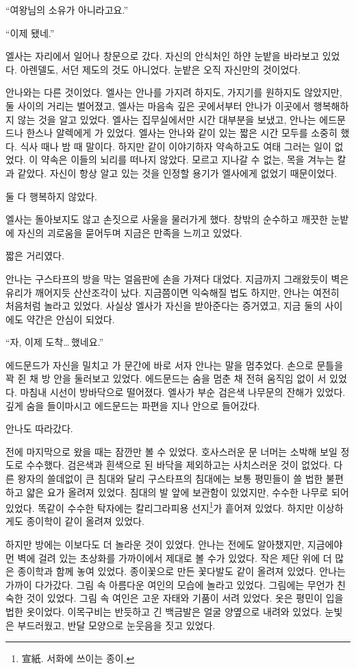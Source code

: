 ``여왕님의 소유가 아니라고요.''

``이제 됐네.''

엘사는 자리에서 일어나 창문으로 갔다. 자신의 안식처인 하얀 눈밭을 바라보고 있었다. 아렌델도, 서던 제도의 것도 아니었다. 눈밭은 오직 자신만의 것이었다.

안나와는 다른 것이었다. 엘사는 안나를 가지려 하지도, 가지기를 원하지도 않았지만, 둘 사이의 거리는 벌어졌고, 엘사는 마음속 깊은 곳에서부터 안나가 이곳에서 행복해하지 않는 것을 알고 있었다. 엘사는 집무실에서만 시간 대부분을 보냈고, 안나는 에드문드나 한스나 알렉에게 가 있었다. 엘사는 안나와 같이 있는 짧은 시간 모두를 소중히 했다. 식사 때나 밤 때 말이다. 하지만 같이 이야기하자 약속하고도 여태 그러는 일이 없었다. 이 약속은 이들의 뇌리를 떠나지 않았다. 모르고 지나갈 수 없는, 목을 겨누는 칼과 같았다. 자신이 항상 알고 있는 것을 인정할 용기가 엘사에게 없었기 때문이었다.

둘 다 행복하지 않았다.

엘사는 돌아보지도 않고 손짓으로 사울을 물러가게 했다. 창밖의 순수하고 깨끗한 눈밭에 자신의 괴로움을 묻어두며 지금은 만족을 느끼고 있었다.

\textbreak

짧은 거리였다.

안나는 구스타프의 방을 막는 얼음판에 손을 가져다 대었다. 지금까지 그래왔듯이 벽은 유리가 깨어지듯 산산조각이 났다. 지금쯤이면 익숙해질 법도 하지만, 안나는 여전히 처음처럼 놀라고 있었다. 사실상 엘사가 자신을 받아준다는 증거였고, 지금 둘의 사이에도 약간은 안심이 되었다.

``자, 이제 도착\ldots\,했네요.''

에드문드가 자신을 밀치고 가 문간에 바로 서자 안나는 말을 멈추었다. 손으로 문틀을 꽉 쥔 채 방 안을 둘러보고 있었다. 에드문드는 숨을 멈춘 채 전혀 움직임 없이 서 있었다. 마침내 시선이 방바닥으로 떨어졌다. 엘사가 부순 검은색 나무문의 잔해가 있었다. 깊게 숨을 들이마시고 에드문드는 파편을 지나 안으로 들어갔다.

안나도 따라갔다.

전에 마지막으로 왔을 때는 잠깐만 볼 수 있었다. 호사스러운 문 너머는 소박해 보일 정도로 수수했다. 검은색과 흰색으로 된 바닥을 제외하고는 사치스러운 것이 없었다. 다른 왕자의 쓸데없이 큰 침대와 달리 구스타프의 침대에는 보통 평민들이 쓸 법한 불편하고 얇은 요가 올려져 있었다. 침대의 발 앞에 보관함이 있었지만, 수수한 나무로 되어 있었다. 똑같이 수수한 탁자에는 칼리그라피용 선지\footnote{宣紙. 서화에 쓰이는 종이.}가 흩어져 있었다. 하지만 이상하게도 종이학이 같이 올려져 있었다.

하지만 방에는 이보다도 더 놀라운 것이 있었다. 안나는 전에도 알아챘지만, 지금에야 먼 벽에 걸려 있는 초상화를 가까이에서 제대로 볼 수가 있었다. 작은 제단 위에 더 많은 종이학과 함께 놓여 있었다. 종이꽃으로 만든 꽃다발도 같이 올려져 있었다. 안나는 가까이 다가갔다. 그림 속 아름다운 여인의 모습에 놀라고 있었다. 그림에는 무언가 친숙한 것이 있었다. 그림 속 여인은 고운 자태와 기품이 서려 있었다. 옷은 평민이 입을 법한 옷이었다. 이목구비는 반듯하고 긴 백금발은 얼굴 양옆으로 내려와 있었다. 눈빛은 부드러웠고, 반달 모양으로 눈웃음을 짓고 있었다.

